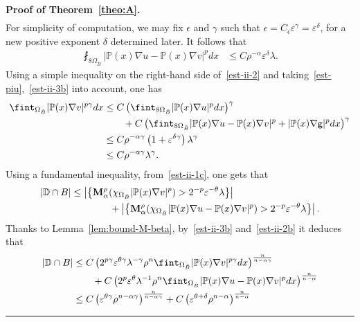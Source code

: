 \documentclass[a4paper, 11pt]{article}
\newenvironment{proof}[1][Proof]{\textbf{#1.} }{\hfill\rule{0.5em}{0.5em}}
\begin{document}
\begin{proof}[Proof of Theorem~\ref{theo:A}]
\begin{align}
\end{align}
For simplicity of computation, we may fix $\epsilon$ and $\gamma$ such that 
$\epsilon = C_{\epsilon} \varepsilon^{\gamma} = \varepsilon^{\delta}$,
for a new positive exponent $\delta$ determined later. It follows that
\begin{align}
 \fint_{8\Omega_{\tilde{B}}} |\mathbb{P}(x)\nabla u - \mathbb{P}(x)\nabla v|^p dx  & \le C \rho^{-\alpha} \varepsilon^{\delta} \lambda.\label{est-ii-3b} 
\end{align}
Using a simple inequality on the right-hand side of~\eqref{est-ii-2} and taking~\eqref{est-piu},~\eqref{est-ii-3b} into account, one has
\begin{align}
\fint_{\Omega_{\tilde{B}}} |\mathbb{P}(x)\nabla v|^{p\gamma}dx  &\le C \left(\fint_{8\Omega_{\tilde{B}}} |\mathbb{P}(x)\nabla u|^{p} dx\right)^{\gamma} \notag \\
& \qquad + C \left(\fint_{8\Omega_{\tilde{B}}} |\mathbb{P}(x)\nabla u - \mathbb{P}(x)\nabla v|^{p} + |\mathbb{P}(x)\nabla \mathsf{g}|^{p} dx \right)^{\gamma}\notag \\
& \le C \rho^{-\alpha\gamma} \left(1 + \varepsilon^{\delta\gamma}\right) \lambda^{\gamma} \notag \\
& \le C \rho^{-\alpha\gamma} \lambda^{\gamma}. \label{est-ii-2b}
\end{align}
Using a fundamental inequality, from~\eqref{est-ii-1c}, one gets that
\begin{align}
|\mathbb{D}\cap B| &\le \left|\left\{\mathbf{M}_{\alpha}^{\rho}(\chi_{\Omega_{\tilde{B}}}|\mathbb{P}(x)\nabla v|^{p}) > 2^{-p} \varepsilon^{-\theta}\lambda\right\}\right|  \notag \\
& \qquad \qquad + \left|\left\{\mathbf{M}_{\alpha}^{\rho}(\chi_{\Omega_{\tilde{B}}}|\mathbb{P}(x)\nabla u - \mathbb{P}(x)\nabla v|^{p}) > 2^{-p}\varepsilon^{-\theta}\lambda\right\}\right|.\notag
\end{align}
Thanks to Lemma~\ref{lem:bound-M-beta}, by~\eqref{est-ii-3b} and~\eqref{est-ii-2b} it deduces that
\begin{align}
|\mathbb{D}\cap B| & \le C \left(2^{p\gamma} \varepsilon^{\theta\gamma}\lambda^{-\gamma} \rho^n \fint_{\Omega_{\tilde{B}}}|\mathbb{P}(x)\nabla v|^{p\gamma}dx\right)^{\frac{n}{n-\alpha\gamma}} \notag \\
& \qquad + C \left(2^{p} \varepsilon^{\theta}\lambda^{-1} \rho^n \fint_{\Omega_{\tilde{B}}}|\mathbb{P}(x)\nabla u - \mathbb{P}(x)\nabla v|^{p}dx\right)^{\frac{n}{n-\alpha}}\notag \\
 & \le C \left(\varepsilon^{\theta\gamma} \rho^{n-\alpha\gamma}\right)^{\frac{n}{n-\alpha\gamma}}  + C \left(\varepsilon^{\theta+\delta} \rho^{n-\alpha}\right)^{\frac{n}{n-\alpha}}\notag \\

\end{align}
\end{proof}
\end{document}

